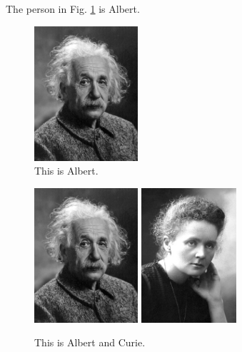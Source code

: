 \documentclass[12pt,a4paper]{article}
\begin{document}
The person in Fig. \ref{albert} is Albert.





\begin{figure}
	\includegraphics[height=50mm]{albert.jpg}
	\caption{This is Albert.} \label{albert}
\end{figure}





\begin{figure}
	\centering
	\includegraphics[height=50mm]{albert.jpg}
	\includegraphics[height=50mm]{curie.jpg}
	\caption{This is Albert and Curie.} \label{albert2}
\end{figure}
\end{document}
